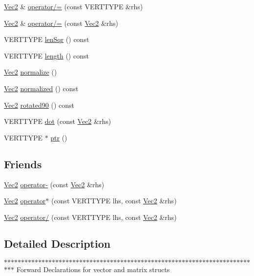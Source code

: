 \begin{DoxyCompactItemize}
\item 
\hyperlink{struct_vec2}{Vec2} \& \hyperlink{struct_vec2_ac23977b34224ad02d6f303db5fbd237c}{operator/=} (const VERTTYPE \&rhs)
\item 
\hyperlink{struct_vec2}{Vec2} \& \hyperlink{struct_vec2_aaf8cc3919507d44a8ffed063d37aec2f}{operator/=} (const \hyperlink{struct_vec2}{Vec2} \&rhs)
\item 
VERTTYPE \hyperlink{struct_vec2_a0b4ec6940ed57339197e4486e4ce6c26}{lenSqr} () const 
\item 
VERTTYPE \hyperlink{struct_vec2_a7d5789c0c0f3d16b31c0ac77faf542e5}{length} () const 
\item 
\hyperlink{struct_vec2}{Vec2} \hyperlink{struct_vec2_aacee0f5c936d87c803c0d632f3d9f4f0}{normalize} ()
\item 
\hyperlink{struct_vec2}{Vec2} \hyperlink{struct_vec2_a2e1afd5523eb873c98e664bae843e2e6}{normalized} () const 
\item 
\hyperlink{struct_vec2}{Vec2} \hyperlink{struct_vec2_ad06cefdb2997fc86367747c3b59d744f}{rotated90} () const 
\item 
VERTTYPE \hyperlink{struct_vec2_a48d6efb6b49362b494a17536b90c489e}{dot} (const \hyperlink{struct_vec2}{Vec2} \&rhs)
\item 
VERTTYPE $\ast$ \hyperlink{struct_vec2_a0c2d5dff96a1ce4457294b8b8b4bca0f}{ptr} ()
\end{DoxyCompactItemize}
\subsection*{Friends}
\begin{DoxyCompactItemize}
\item 
\hyperlink{struct_vec2}{Vec2} \hyperlink{struct_vec2_af222d9fd4967729d928b01c4a64376fc}{operator-\/} (const \hyperlink{struct_vec2}{Vec2} \&rhs)
\item 
\hyperlink{struct_vec2}{Vec2} \hyperlink{struct_vec2_ac17cb14c3e37f6f40d65f99704540873}{operator$\ast$} (const VERTTYPE lhs, const \hyperlink{struct_vec2}{Vec2} \&rhs)
\item 
\hyperlink{struct_vec2}{Vec2} \hyperlink{struct_vec2_a2bcd87497cdc905436f457b41bd47e87}{operator/} (const VERTTYPE lhs, const \hyperlink{struct_vec2}{Vec2} \&rhs)
\end{DoxyCompactItemize}


\subsection{Detailed Description}
$\ast$$\ast$$\ast$$\ast$$\ast$$\ast$$\ast$$\ast$$\ast$$\ast$$\ast$$\ast$$\ast$$\ast$$\ast$$\ast$$\ast$$\ast$$\ast$$\ast$$\ast$$\ast$$\ast$$\ast$$\ast$$\ast$$\ast$$\ast$$\ast$$\ast$$\ast$$\ast$$\ast$$\ast$$\ast$$\ast$$\ast$$\ast$$\ast$$\ast$$\ast$$\ast$$\ast$$\ast$$\ast$$\ast$$\ast$$\ast$$\ast$$\ast$$\ast$$\ast$$\ast$$\ast$$\ast$$\ast$$\ast$$\ast$$\ast$$\ast$$\ast$$\ast$$\ast$$\ast$$\ast$$\ast$$\ast$$\ast$$\ast$$\ast$$\ast$$\ast$$\ast$$\ast$$\ast$ Forward Declarations for vector and matrix structs

